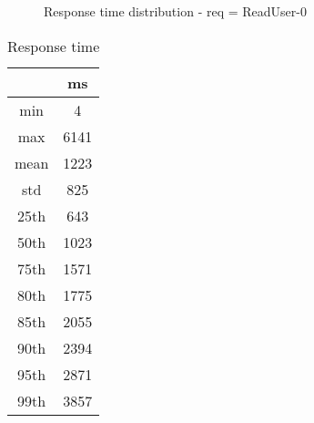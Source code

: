 \begin{minipage}{0.75\linewidth}
\begin{figure}[h]
\begin{adjustbox}{max width=1.0\linewidth, keepaspectratio}
  \end{adjustbox}
  \caption{Response time distribution - req = ReadUser-0}
\end{figure}
\end{minipage}\hfill\begin{minipage}{0.18\linewidth}
\begin{table}[h]
\begin{tabular}{|cc|}
\hline
\textbf{} & \textbf{ms}\\ \hline
 \Xhline{0.005\arrayrulewidth}
min & 4\\
 \Xhline{0.005\arrayrulewidth}
max & 6141\\
 \Xhline{0.005\arrayrulewidth}
mean & 1223\\
 \Xhline{0.005\arrayrulewidth}
std & 825\\
\hline
\hline
 \Xhline{0.005\arrayrulewidth}
25th & 643\\
 \Xhline{0.005\arrayrulewidth}
50th & 1023\\
 \Xhline{0.005\arrayrulewidth}
75th & 1571\\
 \Xhline{0.005\arrayrulewidth}
80th & 1775\\
 \Xhline{0.005\arrayrulewidth}
85th & 2055\\
 \Xhline{0.005\arrayrulewidth}
90th & 2394\\
 \Xhline{0.005\arrayrulewidth}
95th & 2871\\
 \Xhline{0.005\arrayrulewidth}
99th & 3857\\
\hline
\end{tabular}
\caption{Response time}
\end{table}
\end{minipage}\hfill